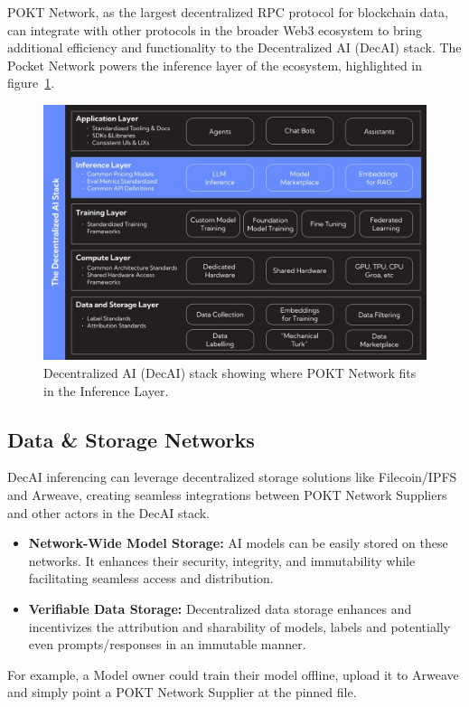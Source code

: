 \documentclass[conference,compsoc]{IEEEtran}
\begin{document}
POKT Network, as the largest decentralized RPC protocol for blockchain data, can integrate with other protocols in the broader Web3 ecosystem to bring additional efficiency and functionality to the Decentralized AI (DecAI) stack. The Pocket Network powers the inference layer of the ecosystem, highlighted in figure~\ref{fig_stack}.


\begin{figure}[!h]
\centering
\includegraphics[width=0.9\linewidth]{stack.jpeg}
\caption{Decentralized AI (DecAI) stack showing where POKT Network fits in the Inference Layer.}
\label{fig_stack}
\end{figure}

\subsection{Data \& Storage Networks}
DecAI inferencing can leverage decentralized storage solutions like Filecoin/IPFS and Arweave, creating seamless integrations between POKT Network Suppliers and other actors in the DecAI stack.

\begin{itemize}
    \item \textbf{Network-Wide Model Storage:} AI models can be easily stored on these networks. It enhances their security, integrity, and immutability while facilitating seamless access and distribution.

    \item \textbf{Verifiable Data Storage:} Decentralized data storage enhances and incentivizes the attribution and sharability of models, labels and potentially even prompts/responses in an immutable manner.

\end{itemize}
For example, a Model owner could train their model offline, upload it to Arweave and simply point a POKT Network Supplier at the pinned file.
\end{document}

